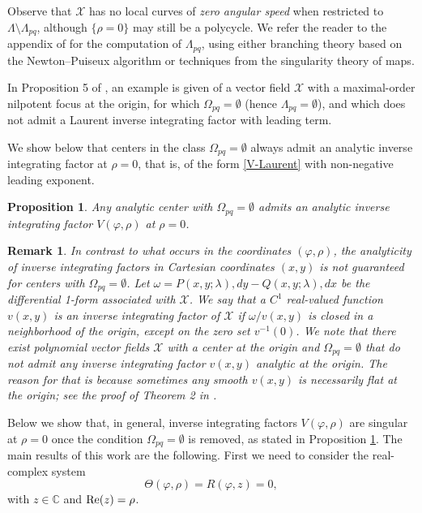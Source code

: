 \documentclass[12pt]{amsart}
\newtheorem {proposition} [theorem]{Proposition}
\newtheorem {remark} [theorem]{\sc Remark}
\begin{document}
Observe that $\mathcal{X}$ has no local curves of {\it zero angular speed} when restricted to $\Lambda \setminus \Lambda_{pq}$, although $\{\rho=0 \}$ may still be a polycycle. We refer the reader to the appendix of \cite{GaGi4} for the computation of $\Lambda_{pq}$, using either branching theory based on the Newton--Puiseux algorithm or techniques from the singularity theory of maps.

In Proposition 5 of \cite{GGR}, an example is given of a vector field $\mathcal{X}$ with a maximal-order nilpotent focus at the origin, for which $\Omega_{pq} = \emptyset$ (hence $\Lambda_{pq} = \emptyset$), and which does not admit a Laurent inverse integrating factor with leading term.

We show below that centers in the class $\Omega_{pq} = \emptyset$ always admit an analytic inverse integrating factor at $\rho=0$, that is, of the form \eqref{V-Laurent} with non-negative leading exponent.

\begin{proposition}\label{prop-monpq}
Any analytic center with $\Omega_{pq} = \emptyset$ admits an analytic inverse integrating factor $V(\varphi, \rho)$ at $\rho=0$.
\end{proposition}

\begin{remark}
{\rm In contrast to what occurs in the coordinates $(\varphi, \rho)$, the analyticity of inverse integrating factors in Cartesian coordinates $(x,y)$ is not guaranteed for centers with $\Omega_{pq} = \emptyset$. Let $\omega = P(x,y; \lambda) , dy - Q(x,y; \lambda) , dx$ be the differential 1-form associated with $\mathcal{X}$. We say that a $C^1$ real-valued function $v(x,y)$ is an inverse integrating factor of $\mathcal{X}$ if $\omega / v(x,y)$ is closed in a neighborhood of the origin, except on the zero set $v^{-1}(0)$. We note that there exist polynomial vector fields $\mathcal{X}$ with a center at the origin and $\Omega_{pq} = \emptyset$ that do not admit any inverse integrating factor $v(x,y)$ analytic at the origin. The reason for that is because sometimes any smooth $v(x,y)$ is necessarily flat at the origin; see the proof of Theorem 2 in \cite{GP}. }
\end{remark}

Below we show that, in general, inverse integrating factors $V(\varphi, \rho)$ are singular at $\rho=0$ once the condition $\Omega_{pq} = \emptyset$ is removed, as stated in Proposition \ref{prop-monpq}. The main results of this work are the following. First we need to consider the real-complex system
\begin{equation}\label{complex-eq}
\Theta(\varphi, \rho) = R(\varphi, z) = 0,
\end{equation}
with  $z \in \mathbb{C}$ and ${\rm Re}(z) = \rho$.
\end{document}
